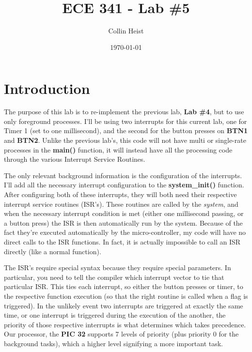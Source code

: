 \documentclass[a4paper, 12pt]{article}
\begin{document}
\title{ECE 341 - Lab \#5}
\author{Collin Heist}
\date{\today}
\maketitle
{}
\tableofcontents
\lstlistoflistings
\newpage
{}

\section{Introduction}
The purpose of this lab is to re-implement the previous lab, \textbf{Lab \#4}, but to use only foreground processes. I'll be using two interrupts for this current lab, one for Timer 1 (set to one millisecond), and the second for the button presses on \textbf{BTN1} and \textbf{BTN2}. Unlike the previous lab's, this code will not have multi or single-rate processes in the \textbf{main()} function, it will instead have all the processing code through the various Interrupt Service Routines.

The only relevant background information is the configuration of the interrupts. I'll add all the necessary interrupt configuration to the \textbf{system\_init()} function. After configuring both of these interrupts, they will both need their respective interrupt service routines (ISR's). These routines are called by the \textit{system}, and when the necessary interrupt condition is met (either one millisecond passing, or a button press) the ISR is then automatically run by the system. Because of the fact they're executed automatically by the micro-controller, my code will have no direct calls to the ISR functions. In fact, it is actually impossible to call an ISR directly (like a normal function).

The ISR's require special syntax because they require special parameters. In particular, you need to tell the compiler which interrupt vector to tie that particular ISR. This ties each interrupt, so either the button presses or timer, to the respective function execution (so that the right routine is called when a flag is triggered). In the unlikely event two interrupts are triggered at exactly the same time, or one interrupt is triggered during the execution of the another, the priority of those respective interrupts is what determines which takes precedence. Our processor, the \textbf{PIC 32} supports 7 levels of priority (plus priority 0 for the background tasks), which a higher level signifying a more important task.
\end{document}
